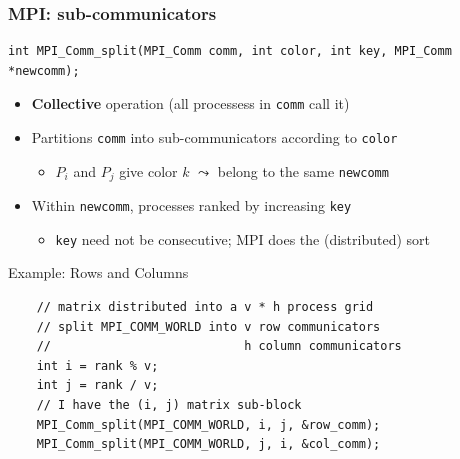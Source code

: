 \documentclass[xcolor={x11names,svgnames},x11names,svgnames]{beamer}
\newcommand{\red}{\alert}
\begin{document}

\begin{frame}[fragile,label=2d]
\frametitle{MPI: sub-communicators}

\begin{verbatim}
int MPI_Comm_split(MPI_Comm comm, int color, int key, MPI_Comm *newcomm);
\end{verbatim}

\medskip

\begin{itemize}
\item \textbf{Collective} operation (all processess in \texttt{comm} call it)
\item \red{Partitions} \texttt{comm} into sub-communicators according to \texttt{color} 
  \begin{itemize}
  \item $P_i$ and $P_j$ give color $k$ $\leadsto$ belong to the same \texttt{newcomm}
  \end{itemize}
\item Within \texttt{newcomm}, processes ranked by increasing \texttt{key}
  \begin{itemize}
  \item \texttt{key} need not be consecutive; MPI does the (distributed) sort
    
  \end{itemize}
\end{itemize}

\begin{block}{Example: Rows and Columns}
  \begin{verbatim}
    // matrix distributed into a v * h process grid
    // split MPI_COMM_WORLD into v row communicators
    //                           h column communicators
    int i = rank % v;
    int j = rank / v;
    // I have the (i, j) matrix sub-block
    MPI_Comm_split(MPI_COMM_WORLD, i, j, &row_comm);
    MPI_Comm_split(MPI_COMM_WORLD, j, i, &col_comm);
  \end{verbatim}
\end{block}

\end{frame}


\end{document}
